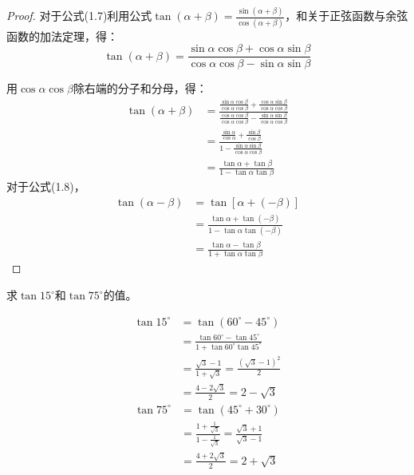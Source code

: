 \begin{proof}
    对于公式(1.7)利用公式$\tan(\alpha+\beta)=
\frac{\sin (\alpha+\beta)}{\cos (\alpha+\beta)}$，和关于正弦函数与余弦函数的加法定理，得：
\[\tan(\alpha+\beta)=\frac{\sin\alpha\cos\beta+\cos\alpha\sin\beta}{\cos\alpha\cos\beta-\sin\alpha\sin\beta} \]

用$\cos\alpha\cos\beta$除右端的分子和分母，得：
\[\begin{split}
    \tan(\alpha+\beta)&=\frac{\frac{\sin\alpha\cos\beta}{\cos\alpha\cos\beta}+\frac{\cos\alpha\sin\beta}{\cos\alpha\cos\beta}}{\frac{\cos\alpha\cos\beta}{\cos\alpha\cos\beta}-\frac{\sin\alpha\sin\beta}{\cos\alpha\cos\beta}}\\
&=\frac{\frac{\sin\alpha}{\cos\alpha}+\frac{\sin\beta}{\cos\beta}}{1-\frac{\sin\alpha\sin\beta}{\cos\alpha\cos\beta}}\\
&=\frac{\tan\alpha+\tan\beta}{1-\tan\alpha\tan\beta}
\end{split}\]
对于公式(1.8)，
\[\begin{split}
    \tan(\alpha-\beta)&=\tan[\alpha+(-\beta)]\\
    &=\frac{\tan\alpha+\tan(-\beta)}{1-\tan\alpha\tan(-\beta)}\\
    &=\frac{\tan\alpha-\tan\beta}{1+\tan\alpha\tan\beta}
\end{split} \]
\end{proof}

\begin{example}
    求$\tan15^{\circ}$和$\tan75^{\circ}$的值。
\end{example}

\begin{solution}
\[\begin{split}
    \tan15^{\circ}&=\tan (60^{\circ}-45^{\circ})\\
&=\frac{\tan 60^{\circ}-\tan 45^{\circ}}{1+\tan 60^{\circ}\tan45^{\circ}}\\
&=\frac{\sqrt{3}-1}{1+\sqrt{3}}=\frac{(\sqrt{3}-1)^2}{2}\\
&=\frac{4-2\sqrt{3}}{2}=2-\sqrt{3}
\end{split}\]
\[\begin{split}
    \tan 75^{\circ}&=\tan (45^{\circ}+30^{\circ})\\
&=\frac{1+\frac{1}{\sqrt{3}}}{1-\frac{1}{\sqrt{3}}}=\frac{\sqrt{3}+1}{\sqrt{3}-1}\\
&=\frac{4+2\sqrt{3}}{2}=2+\sqrt{3}
\end{split}\]
\end{solution}


